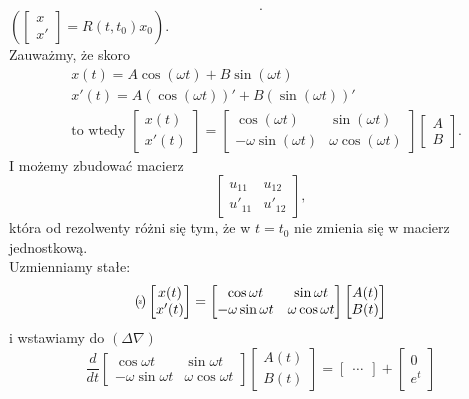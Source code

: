 \documentclass[../main.tex]{subfiles}
\begin{document}
\begin{przyklad}
\[            .\]
            $\left(\begin{bmatrix} x\\x' \end{bmatrix} = R(t,t_0)x_0 \right)$.\\
            Zauważmy, że skoro
            \begin{align*}
                &x(t) = A\cos(\omega t) + B \sin(\omega t)\\
                &x'(t) = A\left( \cos(\omega t) \right)' + B\left( \sin(\omega t) \right)'\\
                &\text{to wtedy } \begin{bmatrix} x(t)\\x'(t) \end{bmatrix} = \begin{bmatrix} \cos(\omega t) & \sin(\omega t)\\ -\omega \sin(\omega t) & \omega \cos(\omega t) \end{bmatrix} \begin{bmatrix} A\\B \end{bmatrix}
            .\end{align*}
            I możemy zbudować macierz
            \[
                \begin{bmatrix} u_{11}&u_{12}\\u'_{11}&u'_{12} \end{bmatrix}
            ,\]
            która od rezolwenty różni się tym, że w $t = t_0$ nie zmienia się w macierz jednostkową.\\
            Uzmienniamy stałe:
            \begin{align*}
                (_{\tilde \tilde} ) \begin{bmatrix} x(t)\\x'(t) \end{bmatrix} = \begin{bmatrix} \cos\omega t & \sin\omega t\\ -\omega \sin\omega t & \omega \cos \omega t \end{bmatrix} \begin{bmatrix} A(t) \\B(t)\end{bmatrix}
            \end{align*}
            i wstawiamy do $(\Delta\nabla)$
            \[
                \frac{d}{dt}\begin{bmatrix} \cos\omega t&\sin\omega t\\ -\omega \sin\omega t & \omega \cos\omega t \end{bmatrix} \begin{bmatrix} A(t)\\B(t) \end{bmatrix} = \begin{bmatrix} \ldots \end{bmatrix} + \begin{bmatrix} 0\\e^t \end{bmatrix}
\]
\end{przyklad}
\end{document}
